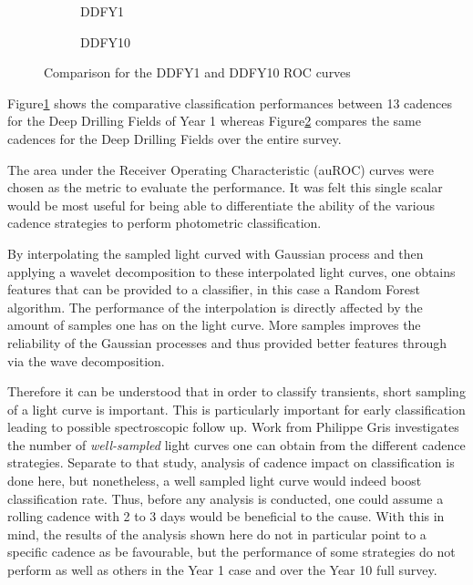 \begin{figure}[h]
    \centering
    \begin{subfigure}
        \texttt{[image: sn\_contrib/figures/photometric\_classification\_roc\_results\_ddfY1.png]}
        \caption{DDFY1}
        \label{fig:ddfy1}
    \end{subfigure}
    \begin{subfigure}
        \texttt{[image: sn\_contrib/figures/photometric\_classification\_roc\_results\_ddfY10.png]}
        \caption{DDFY10}
        \label{fig:ddfy10}
    \end{subfigure}
   \caption{Comparison for the DDFY1 and DDFY10 ROC curves}\label{fig:rocs}
\end{figure}

Figure\ref{fig:ddfy1} shows the
comparative classification performances between 13 cadences for the Deep
Drilling Fields of Year 1 whereas Figure\ref{fig:ddfy10} compares the same
cadences for the Deep Drilling Fields over the entire survey.

The area under
the Receiver Operating Characteristic (auROC) curves were chosen as the metric
to evaluate the performance. It was felt this single scalar would be most useful
for being able to differentiate the ability of the various cadence strategies
to perform photometric classification.

By interpolating the sampled light curved with Gaussian process and then applying a
wavelet decomposition to these interpolated light curves, one obtains features
that can be provided to a classifier, in this case a Random Forest algorithm.
The performance of the interpolation is directly affected by the amount of
samples one has on the light curve. More samples improves the reliability of the
Gaussian processes and thus provided better features through via the wave decomposition.

Therefore it can be understood that in order to classify transients, short sampling of a light
curve is important. This is particularly important for early classification
leading to possible spectroscopic follow up. Work from Philippe Gris
investigates
the number of \emph{well-sampled} light curves one can obtain from the different
cadence strategies. Separate to that study, analysis of cadence impact on
classification is done here, but nonetheless, a well sampled light curve would
indeed boost classification rate. Thus, before any analysis is conducted, one
could assume a rolling cadence with 2 to 3 days would be beneficial to the
cause.
With this in mind, the results of the analysis shown here do not in particular
point to a specific cadence as be favourable, but the performance of some
strategies do not perform as well as others in the Year 1 case and over the
Year 10 full survey.

